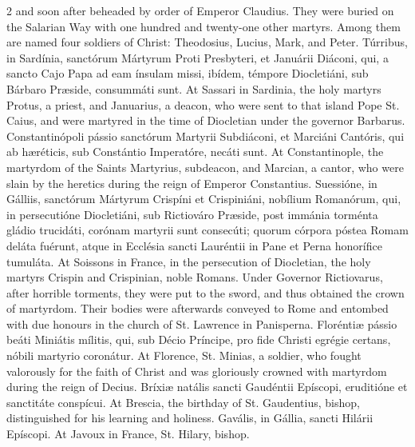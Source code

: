 \begin{paracol}{2}
 and soon after beheaded by order of Emperor Claudius. They were buried 
 on the Salarian Way with one hundred and twenty-one other martyrs. 
 Among them are named four soldiers of Christ: Theodosius, Lucius, Mark, and 
 Peter.
\switchcolumn*
{}
Túrribus, in Sardínia, sanctórum Mártyrum Proti Presbyteri, et Januárii Diáconi, qui, a sancto Cajo 
 Papa ad eam ínsulam missi, ibídem, témpore Diocletiáni, sub Bárbaro Præside, 
 consummáti sunt.
\switchcolumn
{}
At Sassari in Sardinia, the holy 
 martyrs Protus, a priest, and Januarius, a deacon, who were sent to that 
 island Pope St. Caius, and were martyred in the time of Diocletian under the 
 governor Barbarus.
\switchcolumn*
{}
Constantinópoli pássio 
 sanctórum Martyrii Subdiáconi, et Marciáni Cantóris, qui ab hæréticis, sub 
 Constántio Imperatóre, necáti sunt.
\switchcolumn
{}
At Constantinople, the martyrdom of 
 the Saints Martyrius, subdeacon, and Marcian, a cantor, who were slain by 
 the heretics during the reign of Emperor Constantius.
\switchcolumn*
{}
Suessióne, in Gálliis, 
 sanctórum Mártyrum Crispíni et Crispiniáni, nobílium Romanórum, qui, in 
 persecutióne Diocletiáni, sub Rictiováro Præside, post immánia torménta 
 gládio trucidáti, corónam martyrii sunt consecúti; quorum córpora póstea 
 Romam deláta fuérunt, atque in Ecclésia sancti Lauréntii in Pane et Perna 
 honorífice tumuláta.
\switchcolumn
{}
At Soissons in France, in the 
 persecution of Diocletian, the holy martyrs Crispin and Crispinian, noble 
 Romans. Under Governor Rictiovarus, after horrible torments, they were 
 put to the sword, and thus obtained the crown of martyrdom. Their 
 bodies were afterwards conveyed to Rome and entombed with due honours in the 
 church of St. Lawrence in Panisperna.
\switchcolumn*
{}
Floréntiæ pássio beáti 
 Miniátis mílitis, qui, sub Décio Príncipe, pro fide Christi egrégie certans, 
 nóbili martyrio coronátur.
\switchcolumn
{}
At Florence, St. Minias, a soldier, 
 who fought valorously for the faith of Christ and was gloriously crowned 
 with martyrdom during the reign of Decius.
\switchcolumn*
{}
Bríxiæ natális sancti 
 Gaudéntii Epíscopi, eruditióne et sanctitáte conspícui.
\switchcolumn
{}
At Brescia, the birthday of St. 
 Gaudentius, bishop, distinguished for his learning and holiness.
\switchcolumn*
{}
Gavális, in Gállia, 
 sancti Hilárii Epíscopi.
\switchcolumn
{}
At Javoux in France, St. Hilary, 
 bishop.
\switchcolumn*
{}
\end{paracol}


